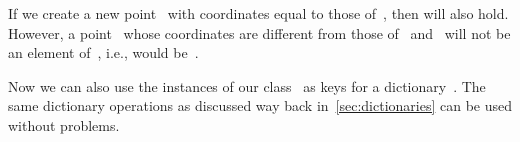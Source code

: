 If we create a new point~ with coordinates equal to those of~, then  will also hold.
However, a point~ whose coordinates are different from those of~ and~ will not be an element of~, i.e.,  would be~.

Now we can also use the instances of our class~ as keys for a dictionary~.
The same dictionary operations as discussed way back in~\cref{sec:dictionaries} can be used without problems.%
%
\FloatBarrier%
\endhsection%
%
\endhsection%
